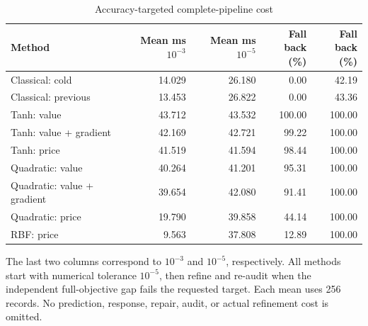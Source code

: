 \begin{table}[p]
\centering
\caption{Accuracy-targeted complete-pipeline cost}\label{tab:r19-cost}
\setlength{\tabcolsep}{4pt}
\begin{tabular}{lrrrr}
\toprule
Method & \shortstack{Mean ms\\$10^{-3}$} & \shortstack{Mean ms\\$10^{-5}$} & \shortstack{Fall back\\(\%)} & \shortstack{Fall back\\(\%)} \\
\midrule
Classical: cold & 14.029 & 26.180 & 0.00 & 42.19 \\
Classical: previous & 13.453 & 26.822 & 0.00 & 43.36 \\
Tanh: value & 43.712 & 43.532 & 100.00 & 100.00 \\
Tanh: value + gradient & 42.169 & 42.721 & 99.22 & 100.00 \\
Tanh: price & 41.519 & 41.594 & 98.44 & 100.00 \\
Quadratic: value & 40.264 & 41.201 & 95.31 & 100.00 \\
Quadratic: value + gradient & 39.654 & 42.080 & 91.41 & 100.00 \\
Quadratic: price & 19.790 & 39.858 & 44.14 & 100.00 \\
RBF: price & 9.563 & 37.808 & 12.89 & 100.00 \\
\bottomrule
\end{tabular}

\par\medskip\begin{minipage}{\textwidth}The last two columns correspond to $10^{-3}$ and $10^{-5}$, respectively. All methods start with numerical tolerance $10^{-5}$, then refine and re-audit when the independent full-objective gap fails the requested target. Each mean uses 256 records. No prediction, response, repair, audit, or actual refinement cost is omitted.\end{minipage}
\end{table}
